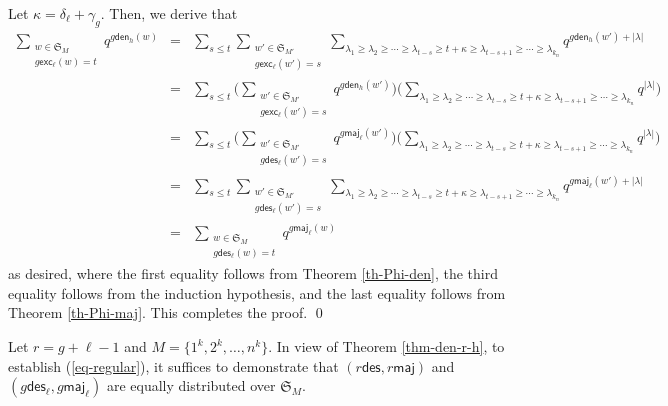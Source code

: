 \documentclass[12pt]{article}
\numberwithin{equation}{section}
\theoremstyle{plain}
\def\des{\mathsf{des}}
\def\maj{\mathsf{maj}}
\def\exc{\mathsf{exc}}
\def\den{\mathsf{den}}
\begin{document}
    Let $\kappa=\delta_\ell+\gamma_g$. 
  Then,  we derive that
  $$
  \begin{array}{lll}
  	\sum\limits_{\substack{w\in \mathfrak{S}_{M}\\
  			g\exc_\ell(w)=t}}q^{g\den_h(w)}&=&\sum\limits_{s\leq t} \sum\limits_{\substack{w'\in \mathfrak{S}_{M'}\\
  			g\exc_\ell(w')=s}}\sum\limits_{\lambda_1\geq \lambda_2\geq \cdots \geq \lambda_{t-s}\geq t+\kappa \geq \lambda_{t-s+1}\geq \cdots\geq \lambda_{k_n}}q^{g\den_{h}(w')+|\lambda|} \\
  		 [2em]
  		&=&\sum\limits_{s\leq t} \big(\sum\limits_{\substack{w'\in \mathfrak{S}_{M'}\\
  				g\exc_\ell(w')=s}}q^{g\den_{h}(w')}\big)  \big(\sum\limits_{\lambda_1\geq \lambda_2\geq \cdots \geq \lambda_{t-s}\geq t+\kappa \geq \lambda_{t-s+1}\geq \cdots\geq \lambda_{k_n}}q^{ |\lambda|} \big)\\
  		 [2em]
  			&=&\sum\limits_{s\leq t} \big(\sum\limits_{\substack{w'\in \mathfrak{S}_{M'}\\
  				g\des_\ell(w')=s}}q^{g\maj_{\ell}(w')}\big)  \big(\sum\limits_{\lambda_1\geq \lambda_2\geq \cdots \geq \lambda_{t-s}\geq t+\kappa \geq \lambda_{t-s+1}\geq \cdots\geq \lambda_{k_n}}q^{ |\lambda|} \big)\\
  		 [2em]
  	&=&\sum\limits_{s\leq t} \sum\limits_{\substack{w'\in \mathfrak{S}_{M'}\\
  			g\des_\ell(w')=s}}\sum\limits_{\lambda_1\geq \lambda_2\geq \cdots \geq \lambda_{t-s}\geq t+\kappa \geq \lambda_{t-s+1}\geq \cdots\geq \lambda_{k_n}}q^{g\maj_{\ell}(w')+|\lambda|} \\
  		 [2em]
  		&=& \sum\limits_{\substack{w\in \mathfrak{S}_{M}\\
  				g\des_\ell(w)=t}}q^{g\maj_\ell(w)} 
  	\end{array}
  	$$
   as desired, where the first equality follows from Theorem \ref{th-Phi-den},  the third equality follows from the induction hypothesis, and the last equality follows from Theorem \ref{th-Phi-maj}.  This completes the proof.  \qed
 
 Let $r=g+\ell-1$ and $M=\{1^k, 2^k, \ldots, n^k\}$.
 In view of Theorem \ref{thm-den-r-h}, to establish  (\ref{eq-regular}), it suffices to demonstrate that 
  $(r\des, r\maj)$ and $(g\des_\ell, g\maj_{\ell})$ are equally distributed over $\mathfrak{S}_{M}$.  
  
\end{document}
